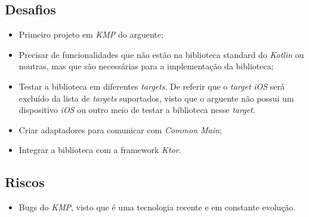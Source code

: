 \subsection{Desafios}\label{subsec:desafios}
\begin{itemize}[topsep=0pt,itemsep=0pt,partopsep=0pt, parsep=0pt]
    \item Primeiro projeto em \textit{KMP} do arguente;
    \item Precisar de funcionalidades que não estão na biblioteca standard do \textit{Kotlin} ou noutras, mas que são necessárias para a implementação da biblioteca;
    \item Testar a biblioteca em diferentes \textit{targets}.
    De referir que o \textit{target} \textit{iOS} será excluído da lista de \textit{targets} suportados, visto que o arguente não possui um dispositivo \textit{iOS} ou outro meio de
    testar a biblioteca nesse \textit{target}.
    \item Criar adaptadores para comunicar com \textit{Common Main};
    \item Integrar a biblioteca com a framework \textit{Ktor}.
\end{itemize}

\subsection{Riscos}\label{subsec:riscos}
\begin{itemize}[topsep=0pt,itemsep=0pt,partopsep=0pt, parsep=0pt]
    \item Bugs do \textit{KMP}, visto que é uma tecnologia recente e em constante evolução.
\end{itemize}
